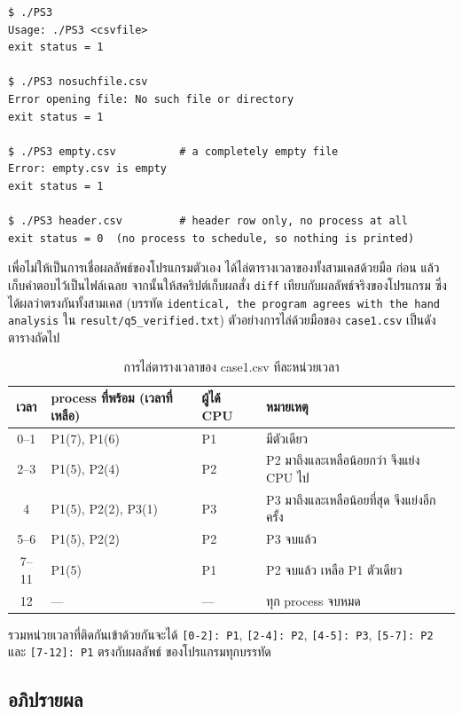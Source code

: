 \documentclass[a4paper,11pt]{article}
\newcommand{\code}[1]{\texttt{#1}}
\begin{document}
\begin{lstlisting}[style=terminal,caption={กรณีขอบ: เรียกโปรแกรมผิดวิธีและไฟล์ที่ใช้ไม่ได้}]
$ ./PS3
Usage: ./PS3 <csvfile>
exit status = 1

$ ./PS3 nosuchfile.csv
Error opening file: No such file or directory
exit status = 1

$ ./PS3 empty.csv          # a completely empty file
Error: empty.csv is empty
exit status = 1

$ ./PS3 header.csv         # header row only, no process at all
exit status = 0  (no process to schedule, so nothing is printed)
\end{lstlisting}

เพื่อไม่ให้เป็นการเชื่อผลลัพธ์ของโปรแกรมตัวเอง ได้ไล่ตารางเวลาของทั้งสามเคสด้วยมือ
ก่อน แล้วเก็บคำตอบไว้เป็นไฟล์เฉลย จากนั้นให้สคริปต์เก็บผลสั่ง \code{diff}
เทียบกับผลลัพธ์จริงของโปรแกรม ซึ่งได้ผลว่าตรงกันทั้งสามเคส (บรรทัด
\code{identical, the program agrees with the hand analysis} ใน
\code{result/q5\_verified.txt}) ตัวอย่างการไล่ด้วยมือของ \code{case1.csv}
เป็นดังตารางถัดไป

\begin{table}[H]
\centering\small
\caption{การไล่ตารางเวลาของ case1.csv ทีละหน่วยเวลา}
\begin{tabular}{cllp{6.6cm}}
\toprule
\textbf{เวลา} & \textbf{process ที่พร้อม (เวลาที่เหลือ)} & \textbf{ผู้ได้ CPU} & \textbf{หมายเหตุ} \\
\midrule
0--1  & P1(7), P1(6)        & P1 & มีตัวเดียว \\
2--3  & P1(5), P2(4)        & P2 & P2 มาถึงและเหลือน้อยกว่า จึงแย่ง CPU ไป \\
4     & P1(5), P2(2), P3(1) & P3 & P3 มาถึงและเหลือน้อยที่สุด จึงแย่งอีกครั้ง \\
5--6  & P1(5), P2(2)        & P2 & P3 จบแล้ว \\
7--11 & P1(5)               & P1 & P2 จบแล้ว เหลือ P1 ตัวเดียว \\
12    & ---                 & ---& ทุก process จบหมด \\
\bottomrule
\end{tabular}
\end{table}

รวมหน่วยเวลาที่ติดกันเข้าด้วยกันจะได้ \code{[0-2]: P1}, \code{[2-4]: P2},
\code{[4-5]: P3}, \code{[5-7]: P2} และ \code{[7-12]: P1} ตรงกับผลลัพธ์
ของโปรแกรมทุกบรรทัด

\subsection{อภิปรายผล}
\end{document}

